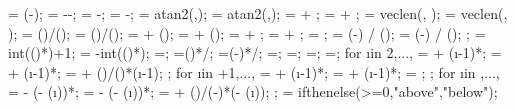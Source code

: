 {{\lenaright = \lenf*(\midratioright-\loadendratio);
\lenamid = \lena-\lenaleft-\lenaright;
\dahleft = \loadarrowheightmid-\loadarrowheightleft;
\dahright = \loadarrowheightmid-\loadarrowheightright;
\ldangleleft = atan2(\dahleft,\lenaleft);
\ldangleright = atan2(\dahright,\lenaright);
\totalangleleft = \loadangle + \ldangleleft;
\totalangleright = \loadangle + \ldangleright;
\totallengthleft = veclen(\lenaleft, \dahleft); %
\totallengthright = veclen(\lenaright, \dahright); %
\loadwxvalue = (\loaddxa)/(); %
\loadwyvalue = (\loaddya)/(); %
 = \loadstartcoordx + \loaddxf*(\loadstartratio);
 = \loadstartcoordy + \loaddyf*(\loadstartratio);
\loadxvalue{\loadarrownumber} =  + \loaddxa;
\loadyvalue{\loadarrownumber} =  + \loaddya;
\loadarrownumbermo = ;
\arrlenratioleft = (\midratioleft-\loadstartratio) / (\arrforceratio);
\arrlenratioright = (\midratioright-\loadendratio) / (\arrforceratio);
;
\leftendarrno = int(()*\arrlenratioleft)+1;
\rightstartarrno = \loadarrownumber-int(()*\arrlenratioright);
\rightendarrno=\loadarrownumbermo;
\leftendarrratio=()*\loadwxvalue/\loaddxaleft;
\rightstartarrratio=(\loadarrownumber-\rightstartarrno)*\loadwxvalue/\loaddxaright;
\leftendarrdist=\leftendarrratio*\lenaleft;
\dahleftend=\leftendarrratio*\dahleft;
\rightstartarrdist=\rightstartarrratio*\lenaright;
\dahrightstart=\rightstartarrratio*\dahright;
for \i in {2,...,{\leftendarrno}}{
\loadxvalue{\i} =  + (\i-1)*\loadwxvalue;
\loadyvalue{\i} =  + (\i-1)*\loadwyvalue;
\loadarrowheight{\i} = \loadarrowheightleft + (\dahleftend)/()*(\i-1);
};
for \i in {{\leftendarrno+1},...,{}}{
	\loadxvalue{\i} =  + (\i-1)*\loadwxvalue;
	\loadyvalue{\i} =  + (\i-1)*\loadwyvalue;
	\loadarrowheight{\i} = \loadarrowheightmid;
};
for \i in {{\rightendarrno},...,{\rightstartarrno}}{
\loadxvalue{\i} = \loadxvalue{\loadarrownumber} - (\loadarrownumber - (\i))*\loadwxvalue;
\loadyvalue{\i} = \loadyvalue{\loadarrownumber} - (\loadarrownumber - (\i))*\loadwyvalue;
\loadarrowheight{\i} = \loadarrowheightright + (\dahrightstart)/(\loadarrownumber-\rightstartarrno)*(\loadarrownumber - (\i));
};
\loc = ifthenelse(\loadarrowheightleft>=0,"above","below");
}


}
